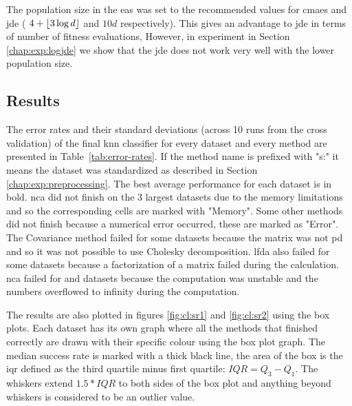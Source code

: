 \documentclass[12pt,a4paper]{report}
\begin{document}
The population size in the \acp{ea} was set to the recommended values for \ac{cmaes} and \ac{jde} ( $4+\lfloor3\log{d}\rfloor$ and $10d$ respectively). This gives an advantage to \ac{jde} in terms of number of fitness evaluations, However, in experiment in Section \ref{chap:exp:logjde} we show that the \ac{jde} does not work very well with the lower population size.

\subsection{Results}

The error rates and their standard deviations (across 10 runs from the cross validation) of the final \ac{knn} classifier for every dataset and every method are presented in Table~\ref{tab:error-rates}. If the method name is prefixed with "s:" it means the dataset was standardized as described in Section \ref{chap:exp:preprocessing}. The best average performance for each dataset is in bold. \ac{nca} did not finish on the 3 largest datasets due to the memory limitations and so the corresponding cells are marked with "Memory". Some other methods did not finish because a numerical error occurred, these are marked as "Error". The Covariance method failed for some datasets because the matrix was not \ac{pd} and so it was not possible to use Cholesky decomposition. \ac{lfda} also failed for some datasets because a factorization of a matrix failed during the calculation. \ac{nca} failed for  and  datasets because the computation was unstable and the numbers overflowed to infinity during the computation.



The results are also plotted in figures \ref{fig:cl:sr1} and \ref{fig:cl:sr2} using the box plots. Each dataset has its own graph where all the methods that finished correctly are drawn with their specific colour using the box plot graph. The median success rate is marked with a thick black line, the area of the box is the \ac{iqr} defined as the third quartile minus first quartile: $IQR = Q_3 - Q_1$. The whiskers extend $1.5*IQR$ to both sides of the box plot and anything beyond whiskers is considered to be an outlier value.


\end{document}
